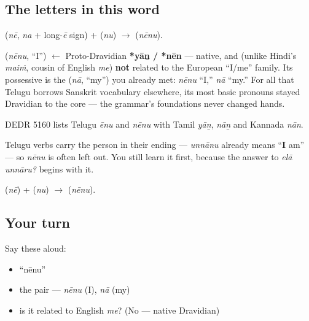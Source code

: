 \subsection*{The letters in this word}
\textbf{} (\emph{nē}, \emph{na} + long-\emph{ē} sign) + \textbf{} (\emph{nu}) $\to$ \textbf{} (\emph{nēnu}).

\begin{cousinweb}
\textbf{} (\emph{nēnu}, \textquotedblleft{}I\textquotedblright{}) $\leftarrow$ Proto-Dravidian \textbf{*yāṉ / *nēn} — native, and (unlike Hindi's \emph{maiṁ}, cousin of English \emph{me}) \textbf{not} related to the European \textquotedblleft{}I/me\textquotedblright{} family. Its possessive is the \textbf{} (\emph{nā}, \textquotedblleft{}my\textquotedblright{}) you already met: \emph{nēnu} \textquotedblleft{}I,\textquotedblright{} \emph{nā} \textquotedblleft{}my.\textquotedblright{} For all that Telugu borrows Sanskrit vocabulary elsewhere, its most basic pronouns stayed Dravidian to the core — the grammar's foundations never changed hands.

DEDR 5160 lists Telugu \emph{ēnu} and \emph{nēnu} with Tamil \emph{yāṉ}, \emph{nāṉ} and Kannada \emph{nān}.
\end{cousinweb}

\begin{grammarlens}[title={Grammar Lens: \textquotedblleft{}I\textquotedblright{} you can drop}]
Telugu verbs carry the person in their ending — \emph{unnānu} already means \textquotedblleft{}\textbf{I} am\textquotedblright{} — so \emph{nēnu} is often left out. You still learn it first, because the answer to \emph{elā unnāru?} begins with it.
\end{grammarlens}

\begin{sounds}
 (\emph{nē}) +  (\emph{nu}) $\to$  (\emph{nēnu}).
\end{sounds}

\subsection*{Your turn}
Say these aloud:

\begin{itemize}
\raggedright
  \item \textquotedblleft{}nēnu\textquotedblright{}
  \item the pair — \emph{nēnu} (I), \emph{nā} (my)
  \item is it related to English \emph{me}? (No — native Dravidian)
\end{itemize}

